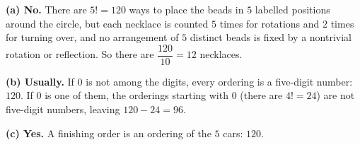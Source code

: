 \textbf{(a) No.} There are $5!=120$ ways to place the beads in $5$ labelled positions around the circle, but each necklace is counted $5$ times for rotations and $2$ times for turning over, and no arrangement of $5$ distinct beads is fixed by a nontrivial rotation or reflection. So there are $\dfrac{120}{10}=\boxed{12}$ necklaces.

\textbf{(b) Usually.} If $0$ is not among the digits, every ordering is a five-digit number: $\boxed{120}$. If $0$ is one of them, the orderings starting with $0$ (there are $4!=24$) are not five-digit numbers, leaving $120-24=\boxed{96}$.

\textbf{(c) Yes.} A finishing order is an ordering of the $5$ cars: $\boxed{120}$.
